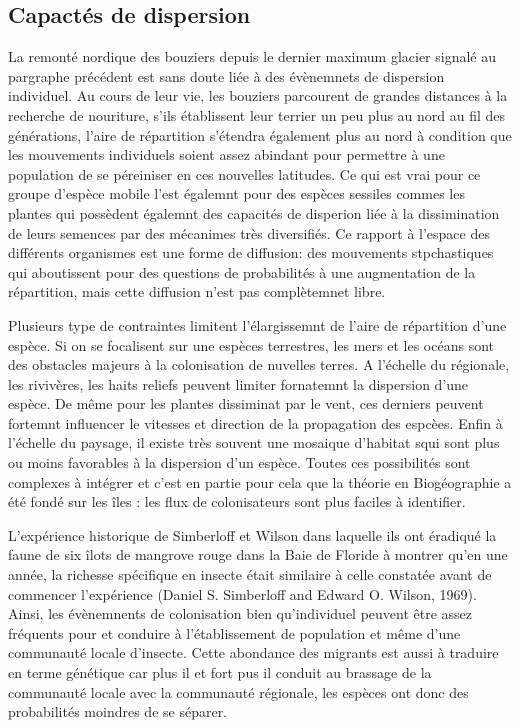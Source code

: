 \subsection*{Capactés de dispersion}\label{capactuxe9s-de-dispersion}

La remonté nordique des bouziers depuis le dernier maximum glacier
signalé au pargraphe précédent est sans doute liée à des évènemnets de
dispersion individuel. Au cours de leur vie, les bouziers parcourent de
grandes distances à la recherche de nouriture, s'ils établissent leur
terrier un peu plus au nord au fil des générations, l'aire de
répartition s'étendra également plus au nord à condition que les
mouvements individuels soient assez abindant pour permettre à une
population de se péreiniser en ces nouvelles latitudes. Ce qui est vrai
pour ce groupe d'espèce mobile l'est égalemnt pour des espèces sessiles
commes les plantes qui possèdent égalemnt des capacités de disperion
liée à la dissimination de leurs semences par des mécanimes très
diversifiés. Ce rapport à l'espace des différents organismes est une
forme de diffusion: des mouvements stpchastiques qui aboutissent pour
des questions de probabilités à une augmentation de la répartition, mais
cette diffusion n'est pas complètemnet libre.

Plusieurs type de contraintes limitent l'élargissemnt de l'aire de
répartition d'une espèce. Si on se focalisent sur une espèces
terrestres, les mers et les océans sont des obstacles majeurs à la
colonisation de nuvelles terres. A l'échelle du régionale, les
rivivères, les haits reliefs peuvent limiter fornatemnt la dispersion
d'une espèce. De même pour les plantes dissiminat par le vent, ces
derniers peuvent fortemnt influencer le vitesses et direction de la
propagation des espcèes. Enfin à l'échelle du paysage, il existe très
souvent une mosaique d'habitat squi sont plus ou moins favorables à la
dispersion d'un espèce. Toutes ces possibilités sont complexes à
intégrer et c'est en partie pour cela que la théorie en Biogéographie a
été fondé sur les îles : les flux de colonisateurs sont plus faciles à
identifier.

L'expérience historique de Simberloff et Wilson dans laquelle ils ont
éradiqué la faune de six îlots de mangrove rouge dans la Baie de Floride
à montrer qu'en une année, la richesse spécifique en insecte était
similaire à celle constatée avant de commencer l'expérience (Daniel S.
Simberloff and Edward O. Wilson, 1969). Ainsi, les évènemnents de
colonisation bien qu'individuel peuvent être assez fréquents pour et
conduire à l'établissement de population et même d'une communauté locale
d'insecte. Cette abondance des migrants est aussi à traduire en terme
génétique car plus il et fort pus il conduit au brassage de la
communauté locale avec la communauté régionale, les espèces ont donc des
probabilités moindres de se séparer.

